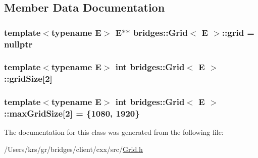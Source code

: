 \subsection{Member Data Documentation}
\hypertarget{classbridges_1_1_grid_aea6c38498d477f09dc03906ee6fb6e19}{}
\subsubsection[{grid}]{\setlength{\rightskip}{0pt plus 5cm}template$<$typename E$>$ E$\ast$$\ast$ {\bf bridges\+::\+Grid}$<$ E $>$\+::grid = nullptr\hspace{0.3cm}{\ttfamily [protected]}}\label{classbridges_1_1_grid_aea6c38498d477f09dc03906ee6fb6e19}
\hypertarget{classbridges_1_1_grid_af7c3a077b54e3346621e54276c1fa13e}{}
\subsubsection[{grid\+Size}]{\setlength{\rightskip}{0pt plus 5cm}template$<$typename E$>$ int {\bf bridges\+::\+Grid}$<$ E $>$\+::grid\+Size\mbox{[}2\mbox{]}\hspace{0.3cm}{\ttfamily [protected]}}\label{classbridges_1_1_grid_af7c3a077b54e3346621e54276c1fa13e}
\hypertarget{classbridges_1_1_grid_a800909a94e0affac82da79cf3e6d03e5}{}
\subsubsection[{max\+Grid\+Size}]{\setlength{\rightskip}{0pt plus 5cm}template$<$typename E$>$ int {\bf bridges\+::\+Grid}$<$ E $>$\+::max\+Grid\+Size\mbox{[}2\mbox{]} = \{1080, 1920\}\hspace{0.3cm}{\ttfamily [protected]}}\label{classbridges_1_1_grid_a800909a94e0affac82da79cf3e6d03e5}


The documentation for this class was generated from the following file\+:\begin{DoxyCompactItemize}
\item 
/\+Users/krs/gr/bridges/client/cxx/src/\hyperlink{_grid_8h}{Grid.\+h}\end{DoxyCompactItemize}
